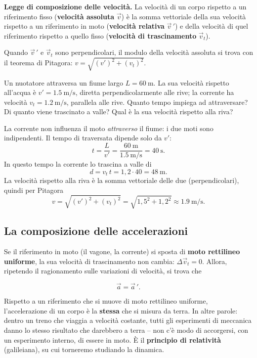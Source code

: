 \begin{definizione}
\textbf{Legge di composizione delle velocità.} La velocità di un corpo rispetto a un riferimento fisso (\textbf{velocità assoluta} $\vec v$) è la somma vettoriale della sua velocità rispetto a un riferimento in moto (\textbf{velocità relativa} $\vec v\,'$) e della velocità di quel riferimento rispetto a quello fisso (\textbf{velocità di trascinamento} $\vec v_t$).
\end{definizione}

Quando $\vec v\,'$ e $\vec v_t$ sono perpendicolari, il modulo della velocità assoluta si trova con il teorema di Pitagora: $v = \sqrt{(v')^2 + (v_t)^2}$.

\begin{testexample}
Un nuotatore attraversa un fiume largo $L = \SI{60}{\metre}$. La sua velocità rispetto all'acqua è $v' = \SI{1,5}{\metre\per\second}$, diretta perpendicolarmente alle rive; la corrente ha velocità $v_t = \SI{1,2}{\metre\per\second}$, parallela alle rive. Quanto tempo impiega ad attraversare? Di quanto viene trascinato a valle? Qual è la sua velocità rispetto alla riva?

La corrente non influenza il moto \emph{attraverso} il fiume: i due moti sono indipendenti. Il tempo di traversata dipende solo da $v'$:
\[ t = \frac{L}{v'} = \frac{\SI{60}{\metre}}{\SI{1,5}{\metre\per\second}} = \SI{40}{\second}. \]
In questo tempo la corrente lo trascina a valle di
\[ d = v_t\,t = 1{,}2 \cdot 40 = \SI{48}{\metre}. \]
La velocità rispetto alla riva è la somma vettoriale delle due (perpendicolari), quindi per Pitagora
\[ v = \sqrt{(v')^2 + (v_t)^2} = \sqrt{1{,}5^2 + 1{,}2^2} \approx \SI{1,9}{\metre\per\second}. \]
\end{testexample}

\subsection{La composizione delle accelerazioni}
Se il riferimento in moto (il vagone, la corrente) si sposta di \textbf{moto rettilineo uniforme}, la sua velocità di trascinamento non cambia: $\Delta\vec v_t = 0$. Allora, ripetendo il ragionamento sulle variazioni di velocità, si trova che

\[ \vec a = \vec a\,'. \]

\begin{remark}
Rispetto a un riferimento che si muove di moto rettilineo uniforme, l'accelerazione di un corpo è la \textbf{stessa} che si misura da terra. In altre parole: dentro un treno che viaggia a velocità costante, tutti gli esperimenti di meccanica danno lo stesso risultato che darebbero a terra -- non c'è modo di accorgersi, con un esperimento interno, di essere in moto. È il \textbf{principio di relatività} (galileiana), su cui torneremo studiando la dinamica.
\end{remark}

